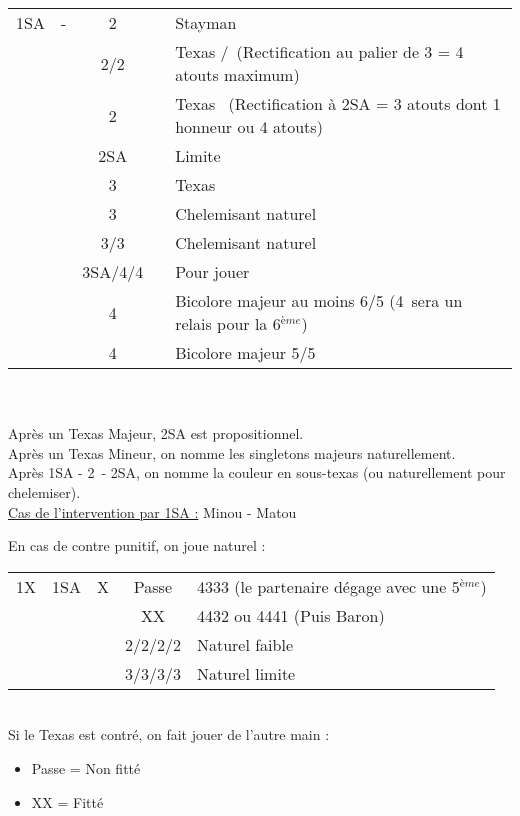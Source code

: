 \documentclass[a4paper, oneside, 11pt]{report}
\begin{document}
		\begin{tabular}{cccc|l}
		1SA & - & 2\trefle && Stayman\\
		&& 2\carreau/2\coeur && Texas \coeur/\pique\ (Rectification au palier de 3 = 4 atouts maximum)\\
		&& 2\pique && Texas \trefle\ (Rectification à 2SA = 3 atouts dont 1 honneur ou 4 atouts)\\
		&& 2SA && Limite\\
		&& 3\trefle && Texas \carreau\\
		&& 3\carreau && Chelemisant naturel\\
		&& 3\coeur/3\pique && Chelemisant naturel\\
		&& 3SA/4\coeur/4\pique && Pour jouer\\
		&& 4\trefle && Bicolore majeur au moins 6/5 (4\carreau\ sera un relais pour la 6$^{ème}$)\\
		&& 4\carreau && Bicolore majeur 5/5\\
		\end{tabular}\\\\

		Après un Texas Majeur,  2SA est propositionnel.\\
		Après un Texas Mineur,  on nomme les singletons majeurs naturellement.\\
		Après 1SA - 2\trefle\ - 2SA,  on nomme la couleur en sous-texas (ou naturellement pour chelemiser).\\

		\underline{Cas de l'intervention par 1SA :} Minou - Matou
	
		En cas de contre punitif, on joue naturel :\\
		\begin{tabular}{cccc|l}
		1X & 1SA & X & Passe & 4333 (le partenaire dégage avec une 5$^{ème}$)\\
		&&& XX & 4432 ou 4441 (Puis Baron)\\
		&&& 2\trefle/2\carreau/2\coeur/2\pique & Naturel faible\\
		&&& 3\trefle/3\carreau/3\coeur/3\pique & Naturel limite\\
		\end{tabular}\\

		Si le Texas est contré, on fait jouer de l'autre main :
		\begin{itemize}
		\item Passe = Non fitté
		\item XX = Fitté\\
		\end{itemize}
		
\end{document}
